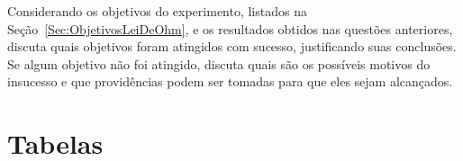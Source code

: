 \begin{question}[type={exam}]{2}
Considerando os objetivos do experimento, listados na Seção~\ref{Sec:ObjetivosLeiDeOhm}, e os resultados obtidos nas questões anteriores, discuta quais objetivos foram atingidos com sucesso, justificando suas conclusões. Se algum objetivo não foi atingido, discuta quais são os possíveis motivos do insucesso e que providências podem ser tomadas para que eles sejam alcançados.
\end{question}

\vfill
\pagebreak
\section{Tabelas}

